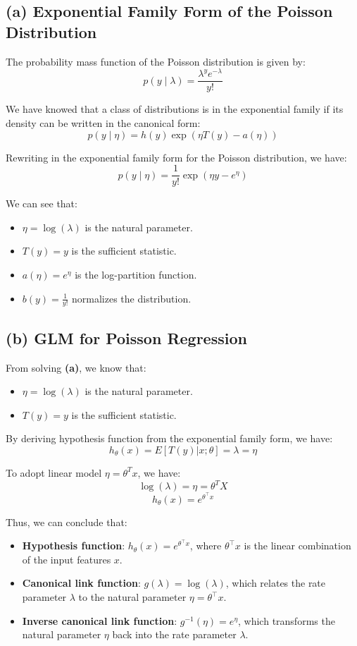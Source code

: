 \documentclass[12pt]{article}
\begin{document}
\subsection*{(a) Exponential Family Form of the Poisson Distribution}

The probability mass function of the Poisson distribution is given by:
\[
p(y \mid \lambda) = \frac{\lambda^y e^{-\lambda}}{y!}
\]

We have knowed that a class of distributions is in the exponential family if its density can be
written in the canonical form:
\[
p(y \mid \eta) = h(y) \exp\left( \eta T(y) - a(\eta) \right)
\]

Rewriting in the exponential family form for the Poisson distribution, we have:
\[
p(y \mid \eta) = \frac{1}{y!} \exp\left( \eta y - e^{\eta} \right)
\]

We can see that:

\begin{itemize}
    \item \( \eta = \log(\lambda) \) is the natural parameter.
    \item \( T(y) = y \) is the sufficient statistic.
    \item \( a(\eta) = e^{\eta} \) is the log-partition function.
    \item \( b(y) = \frac{1}{y!} \) normalizes the distribution.
\end{itemize}

\subsection*{(b) GLM for Poisson Regression}
From solving \textbf{(a)}, we know that:  

\begin{itemize}
    \item \( \eta = \log(\lambda) \) is the natural parameter.
    \item \( T(y) = y \) is the sufficient statistic.
\end{itemize}

By deriving hypothesis function from the exponential family form, we have:
\[
h_\theta(x) = E[T(y)|x; \theta]= \lambda = \eta
\]

To adopt linear model \(\eta = \theta^T x\), we have:
\[
    \log (\lambda) = \eta = \theta^T X
\]
\[
    h_\theta(x) = e^{\theta^\top x}
\]

Thus, we can conclude that:
\begin{itemize}
    \item \textbf{Hypothesis function}: \( h_\theta(x) = e^{\theta^\top x} \), where \( \theta^\top x \) is the linear combination of the input features \( x \).
    \item \textbf{Canonical link function}: \( g(\lambda) = \log(\lambda) \), which relates the rate parameter \( \lambda \) to the natural parameter \( \eta = \theta^\top x \).
    \item \textbf{Inverse canonical link function}: \( g^{-1}(\eta) = e^{\eta} \), which transforms the natural parameter \( \eta \) back into the rate parameter \( \lambda \).
\end{itemize}
\end{document}
